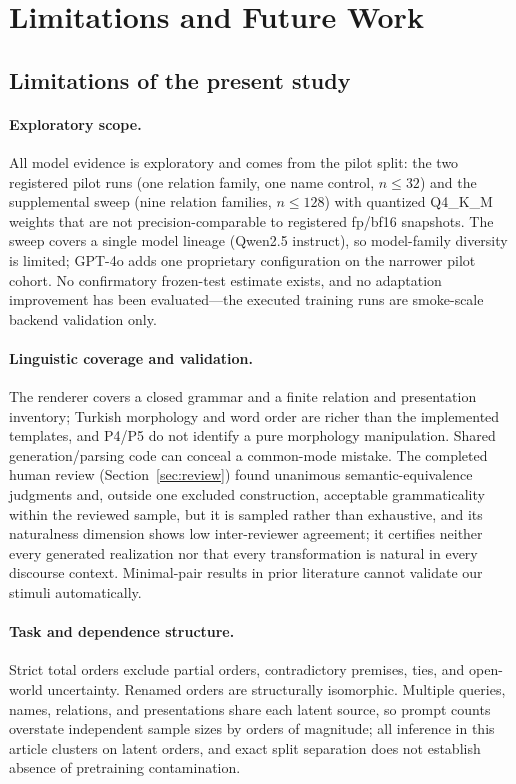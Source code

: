 \section{Limitations and Future Work}
\label{sec:limitations}

\subsection{Limitations of the present study}

\paragraph{Exploratory scope.}
All model evidence is exploratory and comes from the pilot split: the two registered pilot runs
(one relation family, one name control, $n \le 32$) and the supplemental sweep (nine relation families,
$n \le 128$) with quantized Q4\_K\_M weights that are not precision-comparable to registered fp/bf16
snapshots. The sweep covers a single model lineage (Qwen2.5 instruct), so model-family diversity is
limited; GPT-4o adds one proprietary configuration on the narrower pilot cohort. No confirmatory
frozen-test estimate exists, and no adaptation improvement has been evaluated---the executed training runs
are smoke-scale backend validation only.

\paragraph{Linguistic coverage and validation.}
The renderer covers a closed grammar and a finite relation and presentation inventory; Turkish morphology
and word order are richer than the implemented templates, and P4/P5 do not identify a pure morphology
manipulation. Shared generation/parsing code can conceal a common-mode mistake. The completed human review
(Section~\ref{sec:review}) found unanimous semantic-equivalence judgments and, outside one excluded
construction, acceptable grammaticality within the reviewed sample, but it is sampled rather than
exhaustive, and its naturalness dimension shows low inter-reviewer agreement; it certifies neither every
generated realization nor that every transformation is natural in every discourse context. Minimal-pair results in prior literature cannot validate our stimuli automatically.

\paragraph{Task and dependence structure.}
Strict total orders exclude partial orders, contradictory premises, ties, and open-world uncertainty.
Renamed orders are structurally isomorphic. Multiple queries, names, relations, and presentations share
each latent source, so prompt counts overstate independent sample sizes by orders of magnitude; all
inference in this article clusters on latent orders, and exact split separation does not establish absence
of pretraining contamination.

